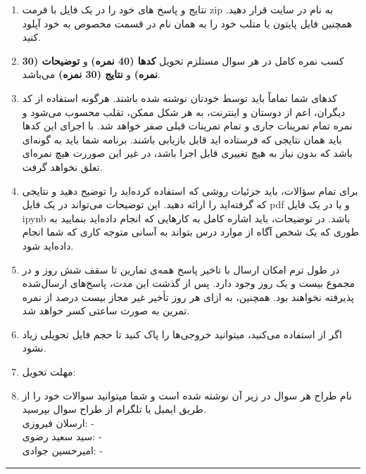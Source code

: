 \documentclass[a4]{article}
\begin{document}
\begin{enumerate}
	\item 
نتایج و پاسخ های خود را در یک فایل با فرمت zip به نام
 در سایت  
\href{https://quera.org/course/add_to_course/course/10598/}{} 
 قرار دهید. همچنین فایل پایتون یا متلب خود را به همان نام در قسمت مخصوص به خود آپلود کنید.
\item 
کسب نمره کامل در هر سوال مستلزم تحویل  
\textbf{کدها (40 نمره)}
 و
\textbf{توضیحات (30 نمره)}
و
\textbf{نتایج (30 نمره)}
 می‌باشد. 
\item 
کدهای شما تماماً باید توسط خودتان نوشته شده باشند. هرگونه استفاده از کد دیگران، اعم از دوستان و اینترنت، به هر شکل ممکن، تقلب محسوب می‌شود و نمره تمام تمرینات جاری و تمام تمرینات قبلی صفر خواهد شد. با اجرای این کدها باید همان نتایجی که فرستاده اید قابل بازیابی باشند. برنامه شما باید به گونه‌ای باشد که بدون نیاز به هیچ تغییری قابل اجرا باشد، در غیر این‌ صوررت هیچ نمره‌ای تعلق نخواهد گرفت. 
\item 
برای تمام سؤالات، باید جزئیات روشی که استفاده کرده‌اید را توضیح دهید و نتایجی که گرفته‌اید را ارائه دهید. این توضیحات می‌تواند در یک فایل  pdf  و یا در یک فایل  ipynb باشد. در توضیحات، باید اشاره کامل به کارهایی که انجام داده‌اید بنمایید به طوری که یک شخص آگاه از موارد درس بتواند به آسانی متوجه کاری که شما انجام داده‌اید شود.
\item 
در طول ترم امکان ارسال با تاخیر پاسخ  همه‌ی تمارین تا سقف شش روز و در مجموع بیست و یک روز وجود دارد. پس از گذشت این مدت، پاسخ‌های ارسال‌شده پذیرفته نخواهند بود. همچنین، به ازای هر روز تأخیر غیر مجاز  بیست درصد از نمره تمرین به صورت ساعتی کسر خواهد شد.
\item 
 اگر از
 استفاده می‌کنید، میتوانید خروجی‌ها‌ را پاک کنید تا حجم فایل تحویلی زیاد نشود.
\item 
مهلت تحویل: 
\item 
نام طراح هر سوال در زیر آن نوشته شده است و شما میتوانید سوالات خود را از طریق ایمیل یا تلگرام از طراح سوال بپرسید.
\\
ارسلان فیروزی:
 - 
\\
سید سعید رضوی:
 - 
\\
امیرحسین جوادی:
 - 

\end{enumerate}
\rule[0.1\baselineskip]{\textwidth}{1pt}

\clearpage
\end{document}
